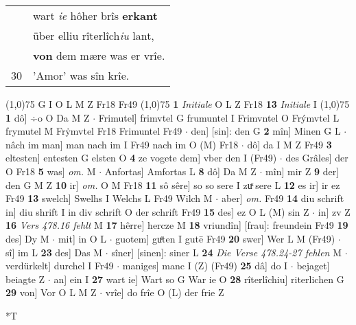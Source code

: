 \documentclass[8pt,a4paper,notitlepage]{article}
\begin{document}
\begin{table}[ht]
\begin{minipage}[t]{0.5\linewidth}
\begin{tabular}{rl}
 & wart \textit{ie} hôher brîs \textbf{erkant}\\ 
 & über elliu rîterlîch\textit{iu} lant,\\ 
 & \textbf{von} dem mære was er vrîe.\\ 
30 & 'Amor' was sîn krîe.\\ 
\end{tabular}
\scriptsize
\line(1,0){75} \newline
G I O L M Z Fr18 Fr49 \newline
\line(1,0){75} \newline
\textbf{1} \textit{Initiale} O L Z Fr18  \textbf{13} \textit{Initiale} I  \newline
\line(1,0){75} \newline
\textbf{1} dô] ÷o O Da M Z  $\cdot$ Frimutel] frimvtel G frumuntel I Frimvntel O Frýmvtel L frymutel M Frẏmvtel Fr18 Frimuntel Fr49  $\cdot$ den] [sin]: den G \textbf{2} mîn] Minen G L  $\cdot$ nâch im man] man nach im I Fr49 nach im O (M) Fr18  $\cdot$ dô] da I M Z Fr49 \textbf{3} eltesten] entesten G elsten O \textbf{4} ze vogete dem] vber den I (Fr49)  $\cdot$ des Grâles] der O Fr18 \textbf{5} was] \textit{om.} M  $\cdot$ Anfortas] Amfortas L \textbf{8} dô] Da M Z  $\cdot$ mîn] mir Z \textbf{9} der] den G M Z \textbf{10} ir] \textit{om.} O M Fr18 \textbf{11} sô sêre] so so sere I zuͯ sere L \textbf{12} es ir] ir ez Fr49 \textbf{13} swelch] Swelhs I Welchs L Fr49 Wilch M  $\cdot$ aber] \textit{om.} Fr49 \textbf{14} diu schrift in] diu shrift I in div schrift O der schrift Fr49 \textbf{15} des] ez O L (M) sin Z  $\cdot$ in] zv Z \textbf{16} \textit{Vers 478.16 fehlt} M  \textbf{17} hêrre] hercze M \textbf{18} vriundîn] [frau]: freundein Fr49 \textbf{19} des] Dy M  $\cdot$ mit] in O L  $\cdot$ guotem] guͤten I gutē Fr49 \textbf{20} swer] Wer L M (Fr49)  $\cdot$ sî] im L \textbf{23} des] Das M  $\cdot$ sîner] [sinen]: siner L \textbf{24} \textit{Die Verse 478.24-27 fehlen} M   $\cdot$ verdürkelt] durchel I Fr49  $\cdot$ maniges] manc I (Z) (Fr49) \textbf{25} dâ] do I  $\cdot$ bejaget] beiagte Z  $\cdot$ an] ein I \textbf{27} wart ie] Wart so G War ie O \textbf{28} rîterlîchiu] riterlichen G \textbf{29} von] Vor O L M Z  $\cdot$ vrîe] do frîe O (L) der frie Z \newline
\end{minipage}
\hspace{0.5cm}
\begin{minipage}[t]{0.5\linewidth}
\small
\begin{center}*T
\end{center}

\end{minipage}
\end{table}
\end{document}
